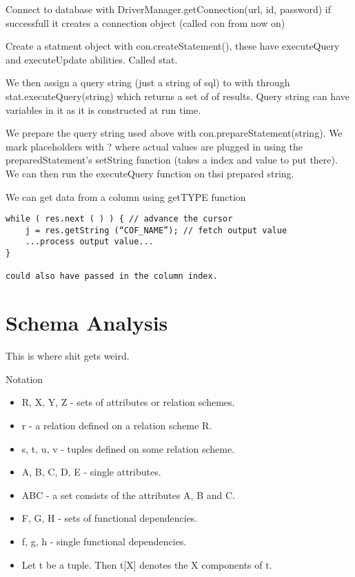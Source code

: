 \documentclass{article}
\begin{document}
Connect to database with DriverManager.getConnection(url, id, password) if successfull it creates a connection object (called con from now on)

Create a statment object with con.createStatement(), these have executeQuery and executeUpdate abilities. Called stat.

We then assign a query string (just a string of sql) to with through stat.executeQuery(string) which returns a set of of results. Query string can have variables in it as it is constructed at run time.

We prepare the query string used above with con.prepareStatement(string). We mark placeholders with ? where actual values are plugged in using the preparedStatement's setString function (takes a index and value to put there). We can then run the executeQuery function on thsi prepared string.

We can get data from a column using getTYPE function
\begin{verbatim}
while ( res.next ( ) ) { // advance the cursor
    j = res.getString (“COF_NAME”); // fetch output value
    ...process output value...
}

could also have passed in the column index.
\end{verbatim}

\section*{Schema Analysis} %
\label{sec:schema_analysis}
This is where shit gets weird.

Notation
\begin{itemize}
    \item R, X, Y, Z - sets of attributes or relation schemes.
    \item r - a relation defined on a relation scheme R.
    \item s, t, u, v - tuples defined on some relation scheme.
    \item A, B, C, D, E - single attributes.
    \item ABC - a set consists of the attributes A, B and C.
    \item F, G, H - sets of functional dependencies.
    \item f, g, h - single functional dependencies.
    \item Let t be a tuple. Then t[X] denotes the X components of t.
\end{itemize}
\end{document}
